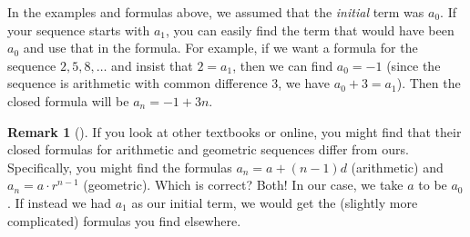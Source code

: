 \documentclass[10pt,]{book}
\theoremstyle{plain}
\theoremstyle{definition}
\newtheorem{remark}[theorem]{Remark}
\theoremstyle{definition}
\theoremstyle{definition}
\theoremstyle{definition}
\numberwithin{equation}{chapter}
\begin{document}
\hypertarget{p-125}{}%
In the examples and formulas above, we assumed that the \emph{initial} term was \(a_0\). If your sequence starts with \(a_1\), you can easily find the term that would have been \(a_0\) and use that in the formula. For example, if we want a formula for the sequence \(2, 5, 8,\ldots\) and insist that \(2= a_1\), then we can find \(a_0 = -1\) (since the sequence is arithmetic with common difference 3, we have \(a_0 + 3 = a_1\)). Then the closed formula will be \(a_n = -1 + 3n\).%
\begin{remark}[]\label{remark-1}
\hypertarget{p-126}{}%
If you look at other textbooks or online, you might find that their closed formulas for arithmetic and geometric sequences differ from ours.  Specifically, you might find the formulas \(a_n = a +(n-1)d\) (arithmetic) and \(a_n = a\cdot r^{n-1}\) (geometric).  Which is correct?  Both!  In our case, we take \(a\) to be \(a_0\).  If instead we had \(a_1\) as our initial term, we would get the (slightly more complicated) formulas you find elsewhere.%
\end{remark}
\typeout{************************************************}
\typeout{************************************************}
\end{document}
